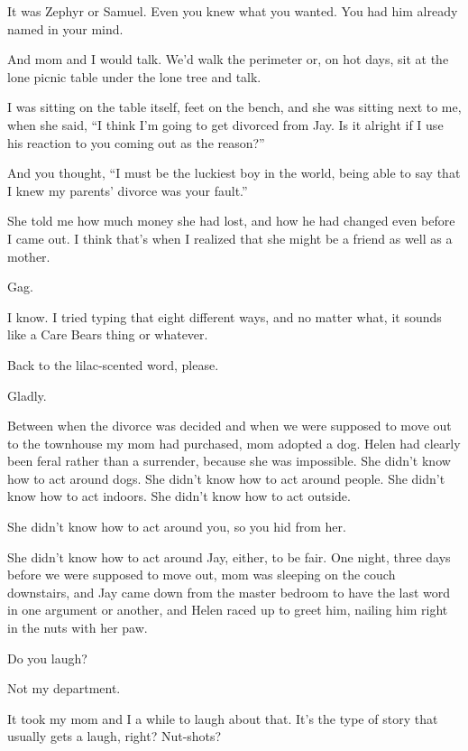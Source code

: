 \begin{ally}
It was Zephyr or Samuel. Even you knew what you wanted. You had him already named in your mind.
\end{ally}
And mom and I would talk. We'd walk the perimeter or, on hot days, sit at the lone picnic table under the lone tree and talk.

I was sitting on the table itself, feet on the bench, and she was sitting next to me, when she said, ``I think I'm going to get divorced from Jay. Is it alright if I use his reaction to you coming out as the reason?''

\begin{ally}
And you thought, ``I must be the luckiest boy in the world, being able to say that I knew my parents' divorce was your fault.''
\end{ally}
She told me how much money she had lost, and how he had changed even before I came out. I think that's when I realized that she might be a friend as well as a mother.

\begin{ally}
Gag.
\end{ally}
I know. I tried typing that eight different ways, and no matter what, it sounds like a Care Bears thing or whatever.

\begin{ally}
Back to the lilac-scented word, please.
\end{ally}
Gladly.
\newpage

Between when the divorce was decided and when we were supposed to move out to the townhouse my mom had purchased, mom adopted a dog. Helen had clearly been feral rather than a surrender, because she was impossible. She didn't know how to act around dogs. She didn't know how to act around people. She didn't know how to act indoors. She didn't know how to act outside.

\begin{ally}
She didn't know how to act around you, so you hid from her.
\end{ally}
She didn't know how to act around Jay, either, to be fair. One night, three days before we were supposed to move out, mom was sleeping on the couch downstairs, and Jay came down from the master bedroom to have the last word in one argument or another, and Helen raced up to greet him, nailing him right in the nuts with her paw.

Do you laugh?

\begin{ally}
Not my department.
\end{ally}
It took my mom and I a while to laugh about that. It's the type of story that usually gets a laugh, right? Nut-shots?

